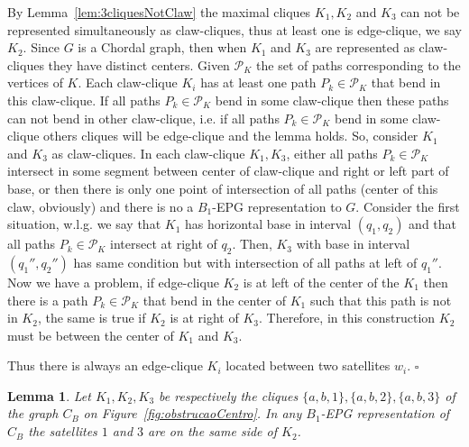 \documentclass[9pt]{entcs}
\newtheorem{lema}{Lemma}[section]
\begin{document}
\begin{pf}
By Lemma~\ref{lem:3cliquesNotClaw} the maximal cliques $K_1, K_2$ and $K_3$ can not be represented simultaneously as claw-cliques, thus at least one is edge-clique, we say $K_2$. Since $G$ is a Chordal graph, then when $K_1$ and $K_3$ are represented as claw-cliques they have  distinct centers.
Given $\mathcal{P}_K$ the set of paths corresponding to the vertices of $K$. 
Each claw-clique $K_i$ has at least one path $P_k \in \mathcal{P}_K$ that bend in this claw-clique. If all paths $P_k \in \mathcal{P}_K$ bend in some claw-clique then these paths can not bend in other claw-clique, i.e. if all paths $P_k \in \mathcal{P}_K$ bend in some claw-clique others cliques will be edge-clique and the lemma holds. So, consider $K_1$ and $K_3$ as claw-cliques.
In each claw-clique $K_1, K_3$, either all paths $P_k \in \mathcal{P}_K$ intersect in some segment between center of claw-clique and right or left part of base, or then there is only one point of intersection of all paths (center of this claw, obviously) and there is no a $B_1$-EPG representation to $G$. Consider the first situation,  w.l.g. we say that $K_1$ has horizontal base in interval $(q_1,q_2)$ and that all paths $P_k \in \mathcal{P}_K$ intersect  at right of $q_2$. Then, $K_3$ with base in interval $(q_1'',q_2'')$ has same condition but with intersection of all paths at left of $q_1''$. Now we have a problem, if edge-clique $K_2$ is at left of the center of the $K_1$ then there is a path $P_k \in \mathcal{P}_K$ that bend in the center of $K_1$ such that this path is not in $K_2$, the same is true if $K_2$ is at right of $K_3$. %
Therefore, in this construction $K_2$ must be between the center of $K_1$ and $K_3$. 

Thus there is always an edge-clique $K_i$ located between two satellites $w_i$. $\square$
\end{pf}


\begin{lema} \label{lem:obstrucaoCentro}
Let $K_1, K_2, K_3$ be respectively the cliques $\{a,b,1\}, \{a,b,2\}, \{a,b,3\}$ of the graph $C_B$ on Figure~\ref{fig:obstrucaoCentro}.
In any $B_1$-EPG representation of $C_{B}$  the satellites $1$ and $3$
are on the same side of $K_2$.
\end{lema}
\end{document}
